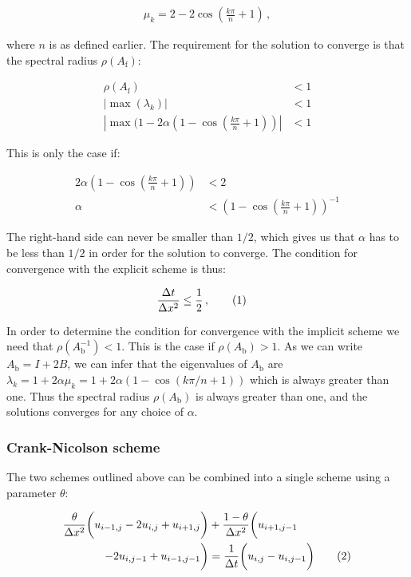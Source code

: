 \documentclass[reprint,english,notitlepage]{revtex4-1}  %
\newcommand\numberthis{\addtocounter{equation}{1}\tag{\theequation}}
\begin{document}
\begin{align*}
\mu_k = 2 - 2\cos(\frac{k\pi}{n} + 1) \, , 
\end{align*}

where $n$ is as defined earlier. The requirement for the solution to converge is that the spectral radius $\rho(A_\text{f})$:

\begin{align*}
\rho(A_\text{f}) &< 1 \\
|\max (\lambda_k) | &< 1 \\
|\max ( 1 - 2\alpha(1 - \cos (\frac{k\pi}{n} + 1) ) | &< 1
\end{align*}

This is only the case if:

\begin{align*}
2\alpha ( 1 - \cos( \frac{k\pi}{n} + 1) ) &< 2 \\
\alpha &< ( 1 - \cos( \frac{k\pi}{n} + 1) )^{-1} 
\end{align*}

The right-hand side can never be smaller than $1/2$, which gives us that $\alpha$ has to be less than $1/2$ in order for the solution to converge. The condition for convergence with the explicit scheme is thus:

\begin{align*}
\frac{\Delta t}{\Delta x^2} &\leq \frac{1}{2} \, , \numberthis \label{eq:forward_euler_convergence}
\end{align*}

In order to determine the condition for convergence with the implicit scheme we need that $\rho(A_\text{b}^{-1}) < 1$. This is the case if $\rho(A_\text{b}) > 1$. As we can write $A_\text{b} = I + 2B$, we can infer that the eigenvalues of $A_\text{b}$ are $\lambda_k = 1 + 2\alpha \mu_k = 1 + 2\alpha (1 - \cos(k\pi/n + 1) )$ which is always greater than one. Thus the spectral radius $\rho(A_\text{b})$ is always greater than one, and the solutions converges for any choice of $\alpha$. 


\subsubsection{Crank-Nicolson scheme} \label{sec:formalism_crank_nicolson}

The two schemes outlined above can be combined into a single scheme using a parameter $\theta$:

\begin{align*}
\frac{\theta}{\Delta x^2} \bigg( u_{i-1,j} - 2u_{i,j} + u_{i+1,j} \bigg) &+ \frac{1 - \theta}{\Delta x^2} \bigg( u_{i+1,j-1} \\
- 2u_{i,j-1} + u_{i-1,j-1} \bigg) &= \frac{1}{\Delta t} \bigg( u_{i,j} - u_{i,j-1} \bigg) \numberthis \label{eq:theta_rule}
\end{align*}
\end{document}
